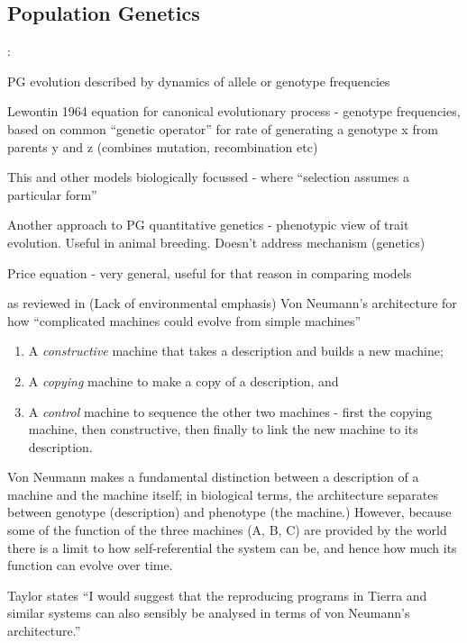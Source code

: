 \subsection{Population Genetics}

\autocite{Paixao2015}:
		
		PG evolution described by dynamics of allele or genotype frequencies
	
		Lewontin 1964 equation for canonical evolutionary process - genotype
		frequencies, based on common ``genetic operator'' for rate of
		generating a genotype x from parents y and z (combines mutation,
		recombination etc)

		This and other models biologically focussed - where ``selection
		assumes a particular form''

		Another approach to PG quantitative genetics - phenotypic view of
		trait evolution. Useful in animal breeding. Doesn't address
		mechanism (genetics)

		Price equation - very general, useful for that reason in comparing
		models

\autocite{VonNeumann1966} as reviewed in \autocite{Taylor1999} (Lack of environmental emphasis)
Von Neumann's architecture for how ``complicated machines could evolve from simple machines''

\begin{enumerate}[label=\Alph*]
	\item A \emph{constructive} machine that takes a description and builds a new machine;
	\item A \emph{copying} machine to make a copy of a description, and 
	\item A \emph{control} machine to sequence the other two machines - first the copying machine, then constructive, then finally to link the new machine to its description.
\end{enumerate}

Von Neumann makes a fundamental distinction between a description of a machine and the machine itself; in biological terms, the architecture separates between genotype (description) and phenotype (the machine.) However, because some of the function of the three machines (A, B, C) are provided by the world there is a limit to how self-referential the system can be, and hence how much its function can evolve over time.

Taylor states ``I would suggest that the reproducing programs in Tierra and similar systems can also sensibly be analysed in terms of von Neumann's architecture.''

